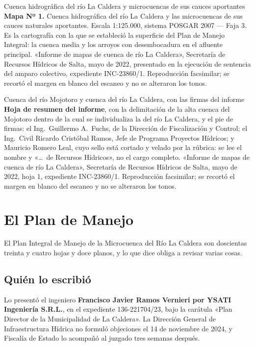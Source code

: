 %
{Cuenca hidrográfica del río La Caldera y microcuencas de sus cauces aportantes}%
{\textbf{Mapa Nº 1.} Cuenca hidrográfica del río La Caldera y las microcuencas de sus cauces
naturales aportantes. Escala 1:125.000, sistema POSGAR 2007 --- Faja 3. Es la cartografía con
la que se estableció la superficie del Plan de Manejo Integral: la cuenca media y los arroyos
con desembocadura en el afluente principal.}%
{«Informe de mapas de cuenca de río La Caldera», Secretaría de Recursos Hídricos de Salta, mayo
de 2022, presentado en la ejecución de sentencia del amparo colectivo, expediente
INC-23860/1. Reproducción facsimilar; se recortó el margen en blanco del escaneo y no se
alteraron los tonos.}

%
{Cuenca del río Mojotoro y cuenca del río La Caldera, con las firmas del informe}%
{\textbf{Hoja de resumen del informe}, con la delimitación de la alta cuenca del Mojotoro
dentro de la cual se individualiza la del río La Caldera, y el pie de firmas: el Ing.\
Guillermo A.\ Fuchs, de la Dirección de Fiscalización y Control; el Ing.\ Civil Ricardo Cristóbal Ramos, Jefe de Programa Proyectos Hídricos; y Mauricio Romero Leal, cuyo sello está cortado
y velado por la rúbrica: se lee el nombre y «\ldots\ de Recursos Hídricos», no el cargo
completo.}%
{«Informe de mapas de cuenca de río La Caldera», Secretaría de Recursos Hídricos de Salta, mayo
de 2022, hoja 1, expediente INC-23860/1. Reproducción facsimilar; se recortó el margen en
blanco del escaneo y no se alteraron los tonos.}

\section{El Plan de Manejo}

El Plan
Integral de Manejo de la Microcuenca del Río La Caldera son doscientas treinta y cuatro hojas
y doce planos, y lo que dice obliga a revisar varias cosas.

\subsection*{Quién lo escribió}

Lo presentó el ingeniero \textbf{Francisco Javier Ramos Vernieri por YSATI Ingeniería
S.R.L.}, en el expediente 136-221704/23, bajo la carátula «Plan Director de la Municipalidad
de La Caldera». La Dirección General de Infraestructura Hídrica no formuló objeciones el 14
de noviembre de 2024, y Fiscalía de Estado lo acompañó al juzgado tres semanas después.

